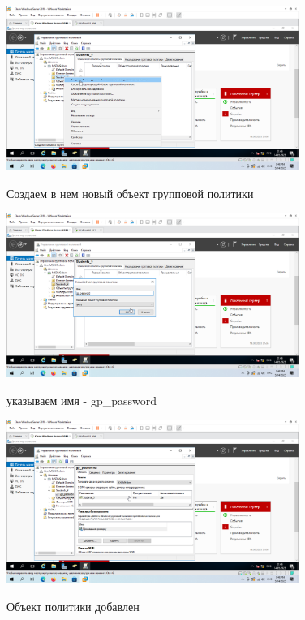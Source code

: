 \documentclass[a4paper]{article}
\begin{document}
  \begin{figure}[H]
    \centering
    \includegraphics[width=0.85\textwidth]{5_0110}
    \label{img:110}
    \caption{Создаем в нем новый объект групповой политики}
  \end{figure}

  \begin{figure}[H]
    \centering
    \includegraphics[width=0.85\textwidth]{5_0111}
    \label{img:111}
    \caption{указываем имя - gp_password}
  \end{figure}

  \begin{figure}[H]
    \centering
    \includegraphics[width=0.85\textwidth]{5_0112}
    \label{img:112}
    \caption{Объект политики добавлен}
  \end{figure}
\end{document}
